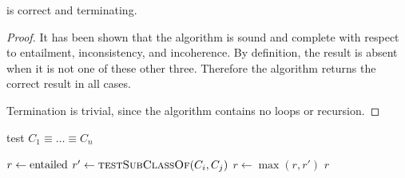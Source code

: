 \documentclass[paper.tex]{subfiles}
\begin{document}
\begin{theorem}
  \label{thm:testSubClassOf}
   is correct and terminating.
\end{theorem}
\begin{proof}
  It has been shown that the algorithm is sound and complete with respect to entailment, inconsistency, and incoherence.  By definition, the result is absent when it is not one of these other three.  Therefore the algorithm returns the correct result in all cases.

  Termination is trivial, since the algorithm contains no loops or recursion.
\end{proof}

\todo[clarify $i$, $j$, $r$, $r'$]

\begin{algorithm}[H]
  \caption{test $C_1 \equiv \ldots \equiv C_n$}
  \begin{algorithmic}[1]
    \raggedright
      \State $r \gets \mathrm{entailed}$
          \State $r' \gets \Call{testSubClassOf}{C_i, C_j}$
          \label{alg:testEquivalentClasses:inner}
          \State $r \gets \max(r, r')$
        \EndFor
      \EndFor
      \State \Return $r$
    \EndFunction
  \end{algorithmic}
\end{algorithm}
\end{document}
